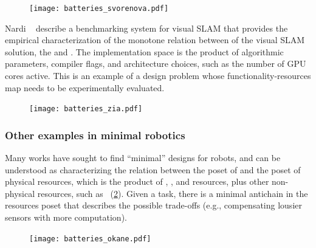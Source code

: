 \begin{figure}[h]
    \centering
    \texttt{[image: batteries\_svorenova.pdf]}
    \caption{\label{fig:progressive-1-1}}
\end{figure}


\begin{example}
Nardi\,\,\etal~\cite{zia16comparative} describe a benchmarking
system for visual SLAM that provides the empirical characterization
of the monotone relation between  of the visual
SLAM solution, the  and . The implementation space is the product
of algorithmic parameters, compiler flags, and architecture choices,
such as the number of GPU cores active. This is an example of a design
problem whose functionality-resources map needs to be experimentally
evaluated.
\end{example}

\begin{figure}[h]
    \centering
    \texttt{[image: batteries\_zia.pdf]}
    \caption{}
\end{figure}


\subsubsection{Other examples in minimal robotics}

Many works have sought to find ``minimal'' designs for robots, and
can be understood as characterizing the relation between the poset
of  and the poset of physical resources, which is the product
of , , and  resources,
plus other non-physical resources, such as ~(\cref{fig:robot-generic}).
Given a task, there is a minimal antichain in the resources poset
that describes the possible trade-offs (e.g., compensating lousier
sensors with more computation). 

\begin{figure}
    \centering
    \texttt{[image: batteries\_okane.pdf]}
    \caption{\label{fig:robot-generic}}
\end{figure}


